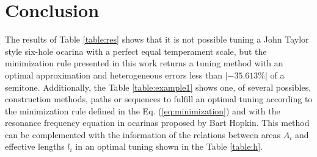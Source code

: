 \documentclass[11pt,twocolumn]{article}
\begin{document}
\begin{table}[h]
\center
{}
\caption{Proposed tuning method.}
\label{table:example1}
\end{table}


\section{Conclusion}
The results of Table \ref{table:res} shows that it is not possible tuning a John Taylor style six-hole ocarina with a perfect equal temperament scale,
but the minimization rule presented in this work returns a tuning method with an optimal approximation and heterogeneous errors less than $|-35.613\%|$ of a semitone.
Additionally, the Table \ref{table:example1} shows one, of several possibles, construction methods, 
paths or sequences to fulfill an optimal tuning according to the minimization rule defined in the Eq. (\ref{eq:minimization}) and with 
the resonance frequency equation in ocarinas proposed by Bart Hopkin.
This method can be complemented with the information of the relations between areas $A_i$ and effective lengths $l_i$ 
in an optimal tuning shown in the Table \ref{table:h}.


\printbibliography


\end{document}
